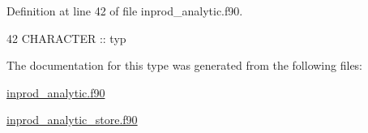 Definition at line 42 of file inprod\+\_\+analytic.\+f90.


\begin{DoxyCode}
42      \textcolor{keywordtype}{CHARACTER} :: typ
\end{DoxyCode}


The documentation for this type was generated from the following files\+:\begin{DoxyCompactItemize}
\item 
\hyperlink{inprod__analytic_8f90}{inprod\+\_\+analytic.\+f90}\item 
\hyperlink{inprod__analytic__store_8f90}{inprod\+\_\+analytic\+\_\+store.\+f90}\end{DoxyCompactItemize}
